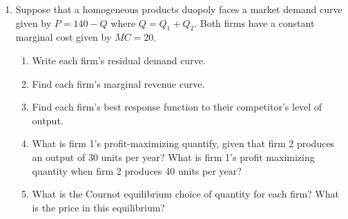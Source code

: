 \documentclass[11pt]{article}
\begin{document}
\begin{enumerate}
  
  \newpage
	\item Suppose that a homogeneous products duopoly faces a market demand curve given by $P = 140 - Q$ where $Q = Q_{1} + Q_{2}$.  Both firms have a constant marginal cost given by $MC = 20$.
  \begin{enumerate}
  \item Write each firm's residual demand curve.
  \vspace*{40mm}  
  \item Find each firm's marginal revenue curve.
  \vspace*{50mm}  
  \item Find each firm's best response function to their competitor's level of output.
  \newpage 
  \item What is firm 1's profit-maximizing quantify, given that firm 2 produces an output of 30 units per year? What is firm 1's profit maximizing quantity when firm 2 produces 40 units per year?
    \vspace*{50mm}  
  \item What is the Cournot equilibrium choice of quantity for each firm?  What is the price in this equilibrium?
  \end{enumerate}
\end{enumerate}
\end{document}
